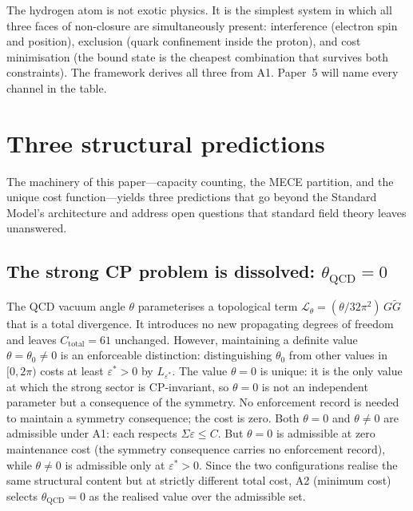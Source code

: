 \documentclass[11pt]{article}
\begin{document}
The hydrogen atom is not exotic physics.  It is the simplest system in
which all three faces of non-closure are simultaneously present:
interference (electron spin and position), exclusion (quark confinement
inside the proton), and cost minimisation (the bound state is the cheapest
combination that survives both constraints).  The framework derives all
three from A1.  Paper~5 will name every channel in the table.


\section{Three structural predictions}
\label{sec:predictions}

The machinery of this paper---capacity counting, the MECE partition, and the unique cost function---yields three predictions that go beyond the Standard Model's architecture and address open questions that standard field theory leaves unanswered.

\subsection{The strong CP problem is dissolved: $\theta_{\mathrm{QCD}} = 0$}
\label{sec:theta_QCD}

The QCD vacuum angle $\theta$ parameterises a topological term $\mathcal{L}_\theta = (\theta/32\pi^2)\,G\tilde{G}$ that is a total divergence.  It introduces no new propagating degrees of freedom and leaves $C_{\mathrm{total}} = 61$ unchanged.  However, maintaining a definite value $\theta = \theta_0 \ne 0$ is an enforceable distinction: distinguishing $\theta_0$ from other values in $[0, 2\pi)$ costs at least $\varepsilon^* > 0$ by $L_{\varepsilon^*}$.  The value $\theta = 0$ is unique: it is the only value at which the strong sector is CP-invariant, so $\theta = 0$ is not an independent parameter but a consequence of the symmetry.  No enforcement record is needed to maintain a symmetry consequence; the cost is zero.  Both $\theta = 0$ and $\theta \ne 0$ are admissible under A1: each respects $\Sigma\varepsilon \le C$.  But $\theta = 0$ is admissible at zero maintenance cost (the symmetry consequence carries no enforcement record), while $\theta \ne 0$ is admissible only at $\varepsilon^* > 0$.  Since the two configurations realise the same structural content but at strictly different total cost, A2 (minimum cost) selects $\theta_{\mathrm{QCD}} = 0$ as the realised value over the admissible set.
\end{document}
